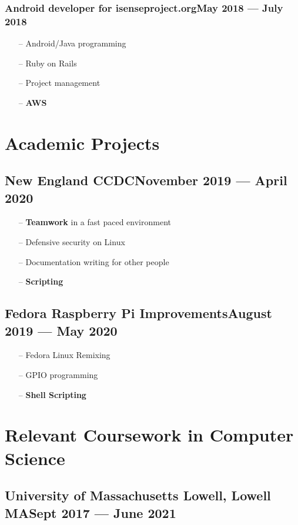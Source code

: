 \documentclass[11pt]{article}
\begin{document}
\subsubsection{Android developer for isenseproject.org\dotfill May 2018 --- July 2018}
\begin{itemize}[noitemsep, topsep=0pt]
	\item[--] Android/Java programming
	\item[--] Ruby on Rails
	\item[--] Project management
	\item[--] {\bf AWS}
\end{itemize}

\section{Academic Projects}

\subsection{{\bf New England CCDC}\dotfill November 2019 --- April 2020 }
\begin{itemize}[noitemsep, topsep=0pt]
	\item[--] {\bf Teamwork} in a fast paced environment
	\item[--] Defensive security on Linux
	\item[--] Documentation writing for other people
	\item[--] {\bf Scripting}
\end{itemize}

\noindent

\subsection{{\bf Fedora Raspberry Pi Improvements}\dotfill August 2019 --- May 2020 }
\begin{itemize}[noitemsep, topsep=0pt]
	\item[--] Fedora Linux Remixing
	\item[--] GPIO programming
	\item[--] {\bf Shell Scripting}
\end{itemize}

\section{Relevant Coursework in Computer Science}
\subsection{University of Massachusetts Lowell, Lowell MA\dotfill Sept 2017 --- June 2021}
\end{document}
